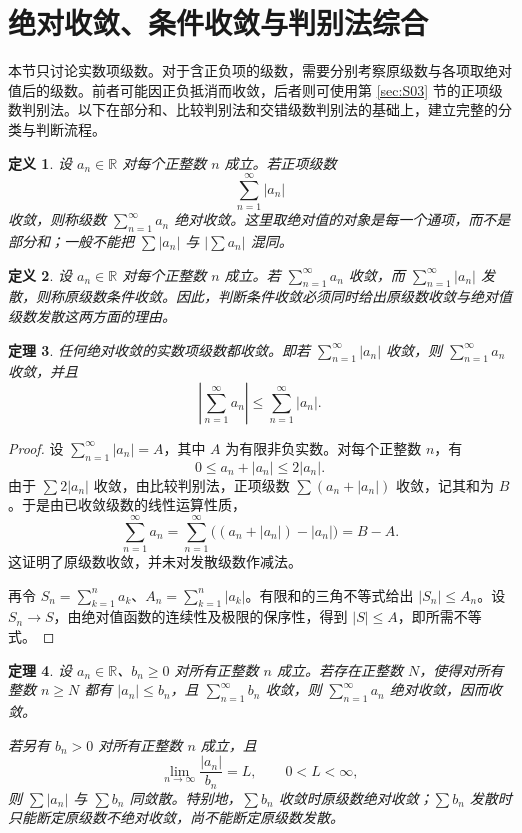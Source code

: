 \documentclass[UTF8,fontset=fandol,11pt]{ctexart}
\newtheorem{definition}{定义}[section]
\newtheorem{theorem}[definition]{定理}
\begin{document}
\section{绝对收敛、条件收敛与判别法综合}\label{sec:S05}
本节只讨论实数项级数。对于含正负项的级数，需要分别考察原级数与各项取绝对值后的级数。前者可能因正负抵消而收敛，后者则可使用第 \ref{sec:S03} 节的正项级数判别法。以下在部分和、比较判别法和交错级数判别法的基础上，建立完整的分类与判断流程。\par
\begin{definition}
\label{def:absolute-convergence}设 $a_n\in\mathbb{R}$ 对每个正整数 $n$ 成立。若正项级数
\[
\sum_{n=1}^{\infty}|a_n|
\]
收敛，则称级数 $\sum_{n=1}^{\infty}a_n$ 绝对收敛。这里取绝对值的对象是每一个通项，而不是部分和；一般不能把 $\sum |a_n|$ 与 $|\sum a_n|$ 混同。
\end{definition}
\begin{definition}
\label{def:conditional-convergence}设 $a_n\in\mathbb{R}$ 对每个正整数 $n$ 成立。若 $\sum_{n=1}^{\infty}a_n$ 收敛，而 $\sum_{n=1}^{\infty}|a_n|$ 发散，则称原级数条件收敛。因此，判断条件收敛必须同时给出原级数收敛与绝对值级数发散这两方面的理由。
\end{definition}
\begin{theorem}
\label{thm:absolute-implies-convergence}任何绝对收敛的实数项级数都收敛。即若 $\sum_{n=1}^{\infty}|a_n|$ 收敛，则 $\sum_{n=1}^{\infty}a_n$ 收敛，并且
\[
\left|\sum_{n=1}^{\infty}a_n\right|\leq\sum_{n=1}^{\infty}|a_n|.
\]
\end{theorem}
\begin{proof}
设 $\sum_{n=1}^{\infty}|a_n|=A$，其中 $A$ 为有限非负实数。对每个正整数 $n$，有
\[
0\leq a_n+|a_n|\leq2|a_n|.
\]
由于 $\sum 2|a_n|$ 收敛，由比较判别法，正项级数 $\sum(a_n+|a_n|)$ 收敛，记其和为 $B$。于是由已收敛级数的线性运算性质，
\[
\sum_{n=1}^{\infty}a_n
=\sum_{n=1}^{\infty}\bigl((a_n+|a_n|)-|a_n|\bigr)
=B-A.
\]
这证明了原级数收敛，并未对发散级数作减法。

再令 $S_n=\sum_{k=1}^{n}a_k$、$A_n=\sum_{k=1}^{n}|a_k|$。有限和的三角不等式给出 $|S_n|\leq A_n$。设 $S_n\to S$，由绝对值函数的连续性及极限的保序性，得到 $|S|\leq A$，即所需不等式。
\end{proof}
\begin{theorem}
\label{thm:comparison-summary}设 $a_n\in\mathbb{R}$、$b_n\geq0$ 对所有正整数 $n$ 成立。若存在正整数 $N$，使得对所有整数 $n\geq N$ 都有 $|a_n|\leq b_n$，且 $\sum_{n=1}^{\infty}b_n$ 收敛，则 $\sum_{n=1}^{\infty}a_n$ 绝对收敛，因而收敛。

若另有 $b_n>0$ 对所有正整数 $n$ 成立，且
\[
\lim_{n\to\infty}\frac{|a_n|}{b_n}=L,\qquad 0<L<\infty,
\]
则 $\sum |a_n|$ 与 $\sum b_n$ 同敛散。特别地，$\sum b_n$ 收敛时原级数绝对收敛；$\sum b_n$ 发散时只能断定原级数不绝对收敛，尚不能断定原级数发散。
\end{theorem}
\end{document}
